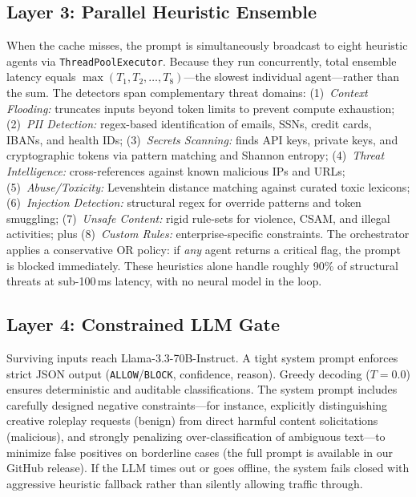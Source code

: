 \documentclass[conference]{IEEEtran}
\begin{document}
\subsection{Layer 3: Parallel Heuristic Ensemble}

When the cache misses, the prompt is simultaneously broadcast to
eight heuristic agents via \texttt{ThreadPoolExecutor}. Because
they run concurrently, total ensemble latency equals
$\max(T_1, T_2, \dots, T_8)$---the slowest individual agent---rather
than the sum. The detectors span complementary threat domains:
(1)~\textit{Context Flooding:} truncates inputs beyond token limits
to prevent compute exhaustion;
(2)~\textit{PII Detection:} regex-based identification of emails,
SSNs, credit cards, IBANs, and health IDs;
(3)~\textit{Secrets Scanning:} finds API keys, private keys, and
cryptographic tokens via pattern matching and Shannon entropy;
(4)~\textit{Threat Intelligence:} cross-references against known
malicious IPs and URLs;
(5)~\textit{Abuse/Toxicity:} Levenshtein distance matching against
curated toxic lexicons;
(6)~\textit{Injection Detection:} structural regex for override
patterns and token smuggling;
(7)~\textit{Unsafe Content:} rigid rule-sets for violence, CSAM,
and illegal activities; plus
(8)~\textit{Custom Rules:} enterprise-specific constraints. The
orchestrator applies a conservative OR policy: if \textit{any} agent
returns a critical flag, the prompt is blocked immediately. These
heuristics alone handle roughly 90\% of structural threats at
sub-100\,ms latency, with no neural model
in the loop.



\subsection{Layer 4: Constrained LLM Gate}

Surviving inputs reach Llama-3.3-70B-Instruct. A tight system prompt
enforces strict JSON output (\texttt{ALLOW}/\texttt{BLOCK},
confidence, reason). Greedy decoding ($T{=}0.0$) ensures
deterministic and auditable classifications. The system prompt includes
carefully designed negative constraints---for instance, explicitly
distinguishing creative roleplay requests (benign) from direct
harmful content solicitations (malicious), and strongly penalizing
over-classification of ambiguous text---to minimize false
positives on borderline cases (the full prompt is available in our
GitHub release). If the LLM times out or goes
offline, the system fails closed with aggressive heuristic fallback
rather than silently allowing traffic through.
\end{document}
